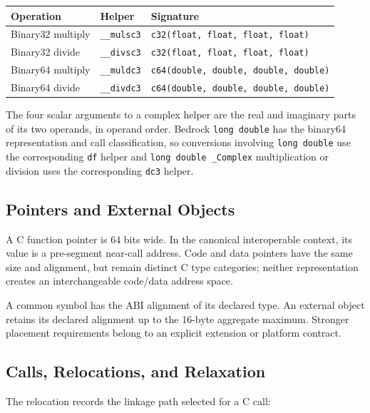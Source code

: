 \documentclass[10pt,twoside]{article}
\begin{document}
\begingroup\footnotesize
\setlength{\tabcolsep}{2pt}
\begin{longtable}{@{}p{1.55in}p{1.55in}p{2.45in}@{}}
\toprule
\textbf{Operation} & \textbf{Helper} & \textbf{Signature}\\
\midrule
\endhead
Binary32 multiply & \texttt{\_\allowbreak{}\_\allowbreak{}mulsc3} & \texttt{c32(float, float, float, float)}\\
Binary32 divide & \texttt{\_\allowbreak{}\_\allowbreak{}divsc3} & \texttt{c32(float, float, float, float)}\\
Binary64 multiply & \texttt{\_\allowbreak{}\_\allowbreak{}muldc3} & \texttt{c64(double, double, double, double)}\\
Binary64 divide & \texttt{\_\allowbreak{}\_\allowbreak{}divdc3} & \texttt{c64(double, double, double, double)}\\
\bottomrule
\end{longtable}
\endgroup

The four scalar arguments to a complex helper are the real and imaginary parts
of its two operands, in operand order. Bedrock \texttt{long double} has the
binary64 representation and call classification, so conversions involving
\texttt{long double} use the corresponding \texttt{df} helper and
\texttt{long double \_Complex} multiplication or division uses the
corresponding \texttt{dc3} helper.

\subsection{Pointers and External Objects}
A C function pointer is 64 bits wide. In the canonical interoperable context,
its value is a pre-segment near-call address. Code and data pointers have the
same size and alignment, but remain distinct C type categories; neither
representation creates an interchangeable code/data address space.

A common symbol has the ABI alignment of its declared type. An external
object retains its declared alignment up to the 16-byte aggregate maximum.
Stronger placement requirements belong to an explicit extension or platform
contract.

\subsection{Calls, Relocations, and Relaxation}
The relocation records the linkage path selected for a C call:
\end{document}

